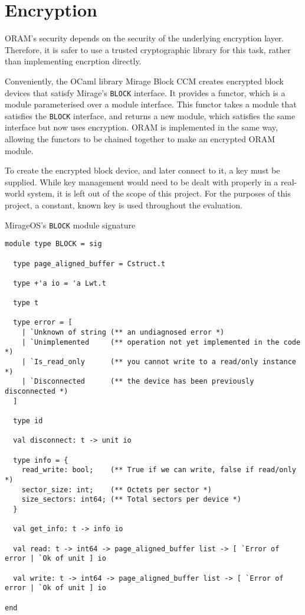 \documentclass[12pt,a4paper,twoside,openright]{report}
\begin{document}
\section{Encryption}
\label{sec:encryption}

ORAM's security depends on the security of the underlying encryption layer. Therefore, it is safer to use a trusted cryptographic library for this task, rather than implementing encrption directly.

Conveniently, the OCaml library Mirage Block CCM creates encrypted block devices that satisfy Mirage's \texttt{BLOCK} interface. It provides a functor, which is a module parameterised over a module interface. This functor takes a module that satisfies the \texttt{BLOCK} interface, and returns a new module, which satisfies the same interface but now uses encryption. ORAM is implemented in the same way, allowing the functors to be chained together to make an encrypted ORAM module.

To create the encrypted block device, and later connect to it, a key must be supplied. While key management would need to be dealt with properly in a real-world system, it is left out of the scope of this project. For the purposes of this project, a constant, known key is used throughout the evaluation.

\begin{listing}[t]
\caption{MirageOS's \texttt{BLOCK} module signature}
\label{lst:blocksig}
\vskip 10pt
\begin{verbatim}
module type BLOCK = sig

  type page_aligned_buffer = Cstruct.t

  type +'a io = 'a Lwt.t

  type t

  type error = [
    | `Unknown of string (** an undiagnosed error *)
    | `Unimplemented     (** operation not yet implemented in the code *)
    | `Is_read_only      (** you cannot write to a read/only instance *)
    | `Disconnected      (** the device has been previously disconnected *)
  ]

  type id

  val disconnect: t -> unit io

  type info = {
    read_write: bool;    (** True if we can write, false if read/only *)
    sector_size: int;    (** Octets per sector *)
    size_sectors: int64; (** Total sectors per device *)
  }

  val get_info: t -> info io

  val read: t -> int64 -> page_aligned_buffer list -> [ `Error of error | `Ok of unit ] io

  val write: t -> int64 -> page_aligned_buffer list -> [ `Error of error | `Ok of unit ] io

end
\end{verbatim}
\end{listing}
\end{document}
